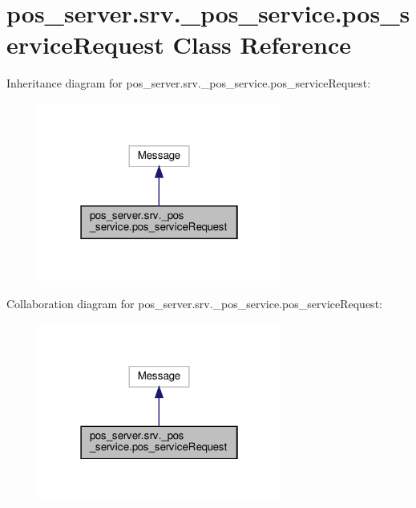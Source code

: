 \hypertarget{classpos__server_1_1srv_1_1__pos__service_1_1pos__serviceRequest}{}\section{pos\+\_\+server.\+srv.\+\_\+pos\+\_\+service.\+pos\+\_\+service\+Request Class Reference}
\label{classpos__server_1_1srv_1_1__pos__service_1_1pos__serviceRequest}


Inheritance diagram for pos\+\_\+server.\+srv.\+\_\+pos\+\_\+service.\+pos\+\_\+service\+Request\+:
\nopagebreak
\begin{figure}[H]
\begin{center}
\leavevmode
\includegraphics[width=226pt]{classpos__server_1_1srv_1_1__pos__service_1_1pos__serviceRequest__inherit__graph}
\end{center}
\end{figure}


Collaboration diagram for pos\+\_\+server.\+srv.\+\_\+pos\+\_\+service.\+pos\+\_\+service\+Request\+:
\nopagebreak
\begin{figure}[H]
\begin{center}
\leavevmode
\includegraphics[width=226pt]{classpos__server_1_1srv_1_1__pos__service_1_1pos__serviceRequest__coll__graph}
\end{center}
\end{figure}
